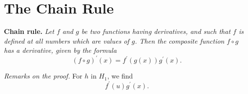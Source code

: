 \section*{The Chain Rule}

\textbf{Chain rule.} \textit{Let $f$ and $g$ be two functions having derivatives, and such that $f$ is defined
  at all numbers which are values of $g$. Then the composite function $f \circ g$ has a derivative, given by
  the formula}
  \[(f \circ g)^\prime(x) = f^\prime(g(x))g^\prime(x).\]

  \textit{Remarks on the proof.} For $h$ in $H_1$, we find
  \[f^\prime(u)g^\prime(x).\]
  
